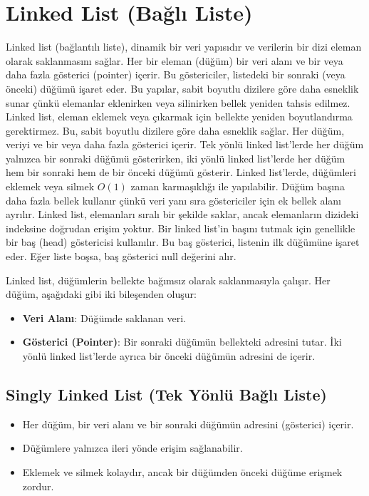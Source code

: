 \section{Linked List (Bağlı Liste)}

Linked list (bağlantılı liste), dinamik bir veri yapısıdır ve verilerin bir dizi eleman olarak saklanmasını sağlar. Her bir eleman (düğüm) bir veri alanı ve bir veya daha fazla gösterici (pointer) içerir. Bu göstericiler, listedeki bir sonraki (veya önceki) düğümü işaret eder. Bu yapılar, sabit boyutlu dizilere göre daha esneklik sunar çünkü elemanlar eklenirken veya silinirken bellek yeniden tahsis edilmez. Linked list, eleman eklemek veya çıkarmak için bellekte yeniden boyutlandırma gerektirmez. Bu, sabit boyutlu dizilere göre daha esneklik sağlar. Her düğüm, veriyi ve bir veya daha fazla gösterici içerir. Tek yönlü linked list'lerde her düğüm yalnızca bir sonraki düğümü gösterirken, iki yönlü linked list'lerde her düğüm hem bir sonraki hem de bir önceki düğümü gösterir. Linked list’lerde, düğümleri eklemek veya silmek $O(1)$ zaman karmaşıklığı ile yapılabilir. Düğüm başına daha fazla bellek kullanır çünkü veri yanı sıra göstericiler için ek bellek alanı ayrılır. Linked list, elemanları sıralı bir şekilde saklar, ancak elemanların dizideki indeksine doğrudan erişim yoktur. Bir linked list’in başını tutmak için genellikle bir baş (head) göstericisi kullanılır. Bu baş gösterici, listenin ilk düğümüne işaret eder. Eğer liste boşsa, baş gösterici null değerini alır.

Linked list, düğümlerin bellekte bağımsız olarak saklanmasıyla çalışır. Her düğüm, aşağıdaki gibi iki bileşenden oluşur:

\begin{itemize}
    \item \textbf{Veri Alanı}: Düğümde saklanan veri.
    \item \textbf{Gösterici (Pointer)}: Bir sonraki düğümün bellekteki adresini tutar. İki yönlü linked list’lerde ayrıca bir önceki düğümün adresini de içerir.
\end{itemize}

\newpage

\subsection{Singly Linked List (Tek Yönlü Bağlı Liste)}

\begin{itemize}
    \item Her düğüm, bir veri alanı ve bir sonraki düğümün adresini (gösterici) içerir.
    \item Düğümlere yalnızca ileri yönde erişim sağlanabilir.
    \item Eklemek ve silmek kolaydır, ancak bir düğümden önceki düğüme erişmek zordur.
\end{itemize}

